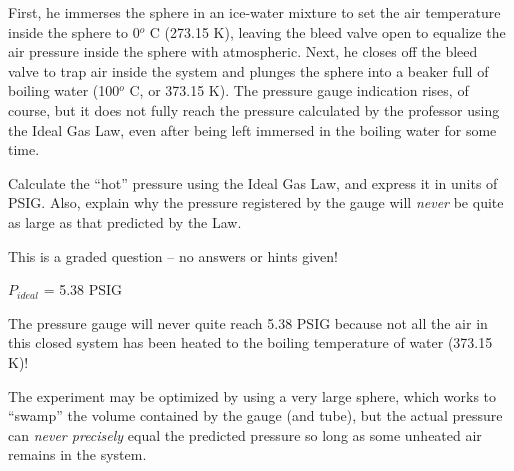 First, he immerses the sphere in an ice-water mixture to set the air temperature inside the sphere to 0$^{o}$ C (273.15 K), leaving the bleed valve open to equalize the air pressure inside the sphere with atmospheric.  Next, he closes off the bleed valve to trap air inside the system and plunges the sphere into a beaker full of boiling water (100$^{o}$ C, or 373.15 K).  The pressure gauge indication rises, of course, but it does not fully reach the pressure calculated by the professor using the Ideal Gas Law, even after being left immersed in the boiling water for some time.

\vskip 10pt

Calculate the ``hot'' pressure using the Ideal Gas Law, and express it in units of PSIG.  Also, explain why the pressure registered by the gauge will {\it never} be quite as large as that predicted by the Law.

\vfil 

\eject






This is a graded question -- no answers or hints given!







$P_{ideal}$ = 5.38 PSIG

\vskip 10pt

The pressure gauge will never quite reach 5.38 PSIG because not all the air in this closed system has been heated to the boiling temperature of water (373.15 K)!

The experiment may be optimized by using a very large sphere, which works to ``swamp'' the volume contained by the gauge (and tube), but the actual pressure can {\it never precisely} equal the predicted pressure so long as some unheated air remains in the system.





